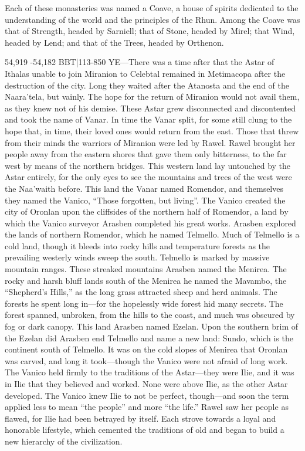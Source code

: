 \documentclass[smalldemyvopaper,11pt,twoside,onecolumn,openright,extrafontsizes]{memoir}
\begin{document}
{{Each of these monasteries was named a Coave, a house of spirits dedicated to the understanding of the world and the principles of the Rhun. Among the Coave was that of Strength, headed by Sarniell; that of Stone, headed by Mirel; that Wind, headed by Lend; and that of the Trees, headed by Orthenon. 

54,919 -54,182 BBT|113-850 YE—There was a time after that the Astar of Ithalas unable to join Miranion to Celebtal remained in Metimacopa after the destruction of the city. Long they waited after the Atanosta and the end of the Naara’tela, but vainly. The hope for the return of Miranion would not avail them, as they knew not of his demise. These Astar grew disconnected and discontented and took the name of Vanar. In time the Vanar split, for some still clung to the hope that, in time, their loved ones would return from the east. Those that threw from their minds the warriors of Miranion were led by Rawel. 
Rawel brought her people away from the eastern shores that gave them only bitterness, to the far west by means of the northern bridges. This western land lay untouched by the Astar entirely, for the only eyes to see the mountains and trees of the west were the Naa’waith before. This land the Vanar named Romendor, and themselves they named the Vanico, “Those forgotten, but living”. The Vanico created the city of Oronlan upon the cliffsides of the northern half of Romendor, a land by which the Vanico surveyor Arasben completed his great works. Arasben explored the lands of northern Romendor, which he named Telmello. Much of Telmello is a cold land, though it bleeds into rocky hills and temperature forests as the prevailing westerly winds sweep the south. Telmello is marked by massive mountain ranges. These streaked mountains Arasben named the Menirea. The rocky and harsh bluff lands south of the Menirea he named the Mavambo, the “Shepherd’s Hills,” as the long grass attracted sheep and herd animals. The forests he spent long in—for the hopelessly wide forest hid many secrets. The forest spanned, unbroken, from the hills to the coast, and much was obscured by fog or dark canopy. This land Arasben named Ezelan. Upon the southern brim of the Ezelan did Arasben end Telmello and name a new land: Sundo, which is the continent south of Telmello. It was on the cold slopes of Menirea that Oronlan was carved, and long it took—though the Vanico were not afraid of long work.
The Vanico held firmly to the traditions of the Astar—they were Ilie, and it was in Ilie that they believed and worked. None were above Ilie, as the other Astar developed. The Vanico knew Ilie to not be perfect, though—and soon the term applied less to mean “the people” and more “the life.” Rawel saw her people as flawed, for Ilie had been betrayed by itself.  Each strove towards a loyal and honorable lifestyle, which cemented the traditions of old and began to build a new hierarchy of the civilization.
}}
\end{document}
